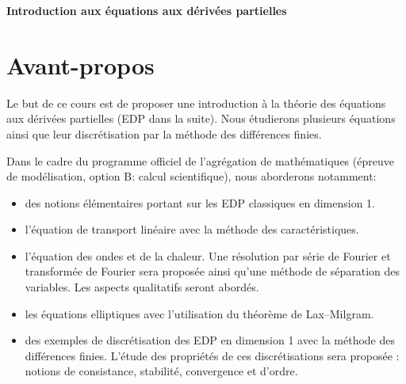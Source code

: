 \documentclass[12pt,a4paper,twoside]{article}
\begin{document}

\newcommand{\Ni}[1]{{\left\|#1\right\|}_\infty}

% 

\begin{center}
{\bf \Huge Introduction aux \'equations aux d\'eriv\'ees partielles}
\end{center}



\section*{Avant-propos}

Le but de ce cours est de proposer une introduction \`a la th\'eorie
des \'equations aux d\'eriv\'ees partielles (EDP dans la suite).
Nous \'etudierons plusieurs \'equations ainsi que leur discr\'etisation
par la m\'ethode des diff\'erences finies.

Dans le cadre du programme officiel de l'agr\'egation
de math\'ematiques (\'epreuve de mod\'elisation, option B: calcul scientifique), 
nous aborderons notamment:
\begin{itemize}
\item des notions \'el\'ementaires portant sur les EDP classiques en dimension 1.
\item l'\'equation de transport lin\'eaire avec la m\'ethode des caract\'eristiques.
\item l'\'equation des ondes et de la chaleur. Une r\'esolution par s\'erie de Fourier
  et transform\'ee de Fourier sera propos\'ee ainsi qu'une m\'ethode de s\'eparation
  des variables.
  Les aspects qualitatifs seront abord\'es.
\item les \'equations elliptiques avec l'utilisation du th\'eor\`eme de Lax--Milgram.
\item des exemples de discr\'etisation des EDP en dimension 1 avec la m\'ethode des
  diff\'erences finies. L'\'etude des propri\'et\'es de ces discr\'etisations
  sera propos\'ee : notions de consistance, stabilit\'e, convergence et d'ordre.
\end{itemize}
\end{document}
